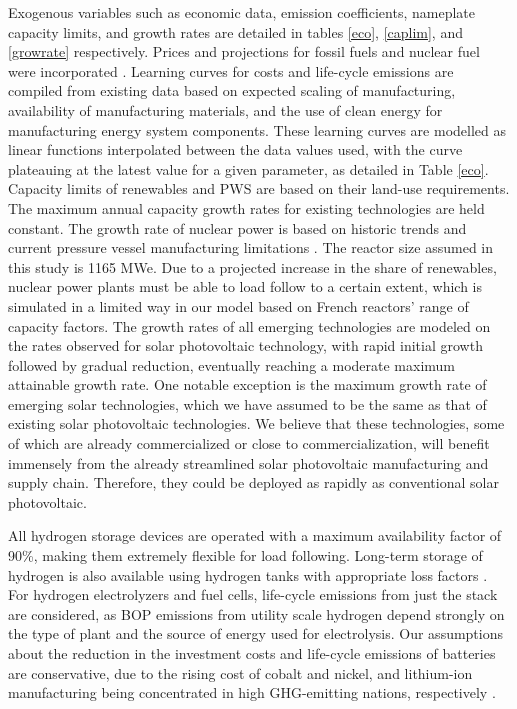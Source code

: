 Exogenous variables such as economic data, emission coefficients, nameplate capacity limits, and growth rates are detailed in tables \ref{eco}, \ref{caplim}, and \ref{growrate} respectively. Prices and projections for fossil fuels and nuclear fuel were incorporated \cite{wittenstein_projected_2015, world_bank_commodity_2016, international_energy_agency_world_2019}. Learning curves for costs and life-cycle emissions are compiled from existing data based on expected scaling of manufacturing, availability of manufacturing materials, and the use of clean energy for manufacturing energy system components. These learning curves are modelled as linear functions interpolated between the data values used, with the curve plateauing at the latest value for a given parameter, as detailed in Table \ref{eco}. Capacity limits of renewables and \gls{PWS} are based on their land-use requirements. The maximum annual capacity growth rates for existing technologies are held constant. The growth rate of nuclear power is based on historic trends and current pressure vessel manufacturing limitations \cite{iaea_pris_nodate}. The reactor size assumed in this study is 1165 MWe. Due to a projected increase in the share of renewables, nuclear power plants must be able to load follow to a certain extent, which is simulated in a limited way in our model based on French reactors' range of capacity factors. The growth rates of all emerging technologies are modeled on the rates observed for solar photovoltaic technology, with rapid initial growth followed by gradual reduction, eventually reaching a moderate maximum attainable growth rate. One notable exception is the maximum growth rate of emerging solar technologies, which we have assumed to be the same as that of existing solar photovoltaic technologies. We believe that these technologies, some of which are already commercialized or close to commercialization, will benefit immensely from the already streamlined solar photovoltaic manufacturing and supply chain. Therefore, they could be deployed as rapidly as conventional solar photovoltaic. 

All hydrogen storage devices are operated with a maximum availability factor of 90\%, making them extremely flexible for load following. Long-term storage of hydrogen is also available using hydrogen tanks with appropriate loss factors \cite{iea_technology_2015}. For hydrogen electrolyzers and fuel cells, life-cycle emissions from just the stack are considered, as \gls{BOP} emissions from utility scale hydrogen depend strongly on the type of plant and the source of energy used for electrolysis. Our assumptions about the reduction in the investment costs and life-cycle emissions of batteries are conservative, due to the rising cost of cobalt and nickel, and lithium-ion manufacturing being concentrated in high \gls{GHG}-emitting nations, respectively \cite{oliveira_environmental_2015,emilsson_lithium-ion_2019,turcheniuk_ten_2018,simon_potential_2015}. 

